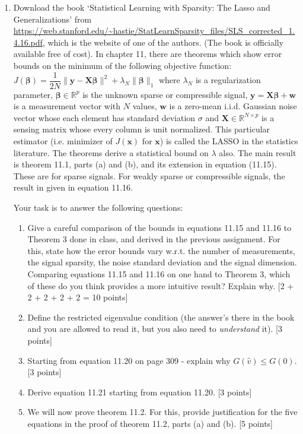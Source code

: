 \documentclass[11pt]{article}
\begin{document}
\begin{enumerate}
\item Download the book `Statistical Learning with Sparsity: The Lasso and Generalizations' from \url{https://web.stanford.edu/~hastie/StatLearnSparsity_files/SLS_corrected_1.4.16.pdf}, which is the website of one of the authors. (The book is officially available free of cost). In chapter 11, there are theorems which show error bounds on the minimum of the following objective function: $J(\boldsymbol{\beta}) = \dfrac{1}{2N} \|\boldsymbol{y} - \boldsymbol{X \beta}\|^2 + \lambda_N \|\boldsymbol{\beta}\|_1$ where $\lambda_N$ is a regularization parameter, $\boldsymbol{\beta} \in \mathbb{R}^p$ is the unknown sparse or compressible signal, $\boldsymbol{y} = \boldsymbol{X \beta} + \boldsymbol{w}$ is a measurement vector with $N$ values, $\boldsymbol{w}$ is a zero-mean i.i.d. Gaussian noise vector whose each element has standard deviation $\sigma$ and $\boldsymbol{X} \in \mathbb{R}^{N \times p}$ is a sensing matrix whose every column is unit normalized. This particular estimator (i.e. minimizer of $J(\boldsymbol{x})$ for $\boldsymbol{x}$) is called the LASSO in the statistics literature. The theorems derive a statistical bound on $\lambda$ also. The main result is theorem 11.1, parts (a) and (b), and its extension in equation (11.15). These are for sparse signals. For weakly sparse or compressible signals, the result in given in equation 11.16. 

Your task is to answer the following questions:
\begin{enumerate}
\item Give a careful comparison of the bounds in equations 11.15 and 11.16 to Theorem 3 done in class, and derived in the previous assignment. For this, state how the error bounds vary w.r.t. the number of measurements, the signal sparsity, the noise standard deviation and the signal dimension. Comparing equations 11.15 and 11.16 on one hand to Theorem 3, which of these do you think provides a more intuitive result? Explain why. \textsf{[2 + 2 + 2 + 2 + 2 = 10 points]}
\item Define the restricted eigenvalue condition (the answer's there in the book and you are allowed to read it, but you also need to \emph{understand} it). \textsf{[3 points]}
\item Starting from equation 11.20 on page 309 - explain why $G(\hat{v}) \leq G(0)$. \textsf{[3 points]}
\item Derive equation 11.21 starting from equation 11.20. \textsf{[3 points]}
\item We will now prove theorem 11.2. For this, provide justification for the five equations in the proof of theorem 11.2, parts (a) and (b). \textsf{[5 points]}
\end{enumerate}


\end{enumerate}
\end{document}
